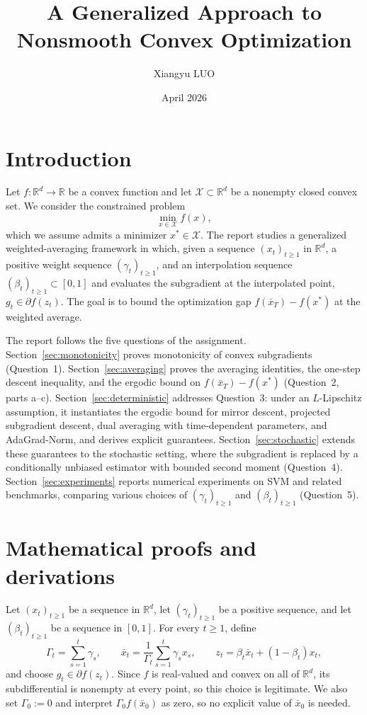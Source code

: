\documentclass[11pt]{article}
\title{A Generalized Approach to Nonsmooth Convex Optimization}
\author{Xiangyu LUO}
\date{April 2026}
\theoremstyle{definition}
\theoremstyle{remark}
\newcommand{\R}{\mathbb{R}}
\newcommand{\X}{\mathcal{X}}
\begin{document}
\maketitle

\tableofcontents

\section{Introduction}
Let $f : \R^d \to \R$ be a convex function and let $\X \subset \R^d$ be a nonempty closed convex set. We consider the constrained problem
\[
    \min_{x \in \X} f(x),
\]
which we assume admits a minimizer $x^* \in \X$. The report studies a generalized weighted-averaging framework in which, given a sequence $(x_t)_{t\ge 1}$ in $\R^d$, a positive weight sequence $(\gamma_t)_{t\ge 1}$, and an interpolation sequence $(\beta_t)_{t\ge 1} \subset [0,1]$ and evaluates the subgradient at the interpolated point, $g_t \in \partial f(z_t)$. The goal is to bound the optimization gap $f(\bar{x}_T)-f(x^*)$ at the weighted average.

The report follows the five questions of the assignment. Section~\ref{sec:monotonicity} proves monotonicity of convex subgradients (Question~1). Section~\ref{sec:averaging} proves the averaging identities, the one-step descent inequality, and the ergodic bound on $f(\bar{x}_T)-f(x^*)$ (Question~2, parts a--c). Section~\ref{sec:deterministic} addresses Question~3: under an $L$-Lipschitz assumption, it instantiates the ergodic bound for mirror descent, projected subgradient descent, dual averaging with time-dependent parameters, and AdaGrad-Norm, and derives explicit guarantees. Section~\ref{sec:stochastic} extends these guarantees to the stochastic setting, where the subgradient is replaced by a conditionally unbiased estimator with bounded second moment (Question~4). Section~\ref{sec:experiments} reports numerical experiments on SVM and related benchmarks, comparing various choices of $(\gamma_t)_{t\ge 1}$ and $(\beta_t)_{t\ge 1}$ (Question~5).

\section{Mathematical proofs and derivations}

Let $(x_t)_{t\ge 1}$ be a sequence in $\R^d$, let $(\gamma_t)_{t\ge 1}$ be a positive sequence, and let $(\beta_t)_{t\ge 1}$ be a sequence in $[0,1]$. For every $t\ge 1$, define
\[
    \Gamma_t = \sum_{s=1}^t \gamma_s,
    \qquad
    \bar{x}_t = \frac{1}{\Gamma_t}\sum_{s=1}^t \gamma_s x_s,
    \qquad
    z_t = \beta_t \bar{x}_t + (1-\beta_t)x_t,
\]
and choose $g_t \in \partial f(z_t)$. Since $f$ is real-valued and convex on all of $\R^d$, its subdifferential is nonempty at every point, so this choice is legitimate. We also set $\Gamma_0 := 0$ and interpret $\Gamma_0 f(\bar{x}_0)$ as zero, so no explicit value of $\bar{x}_0$ is needed.
\end{document}
